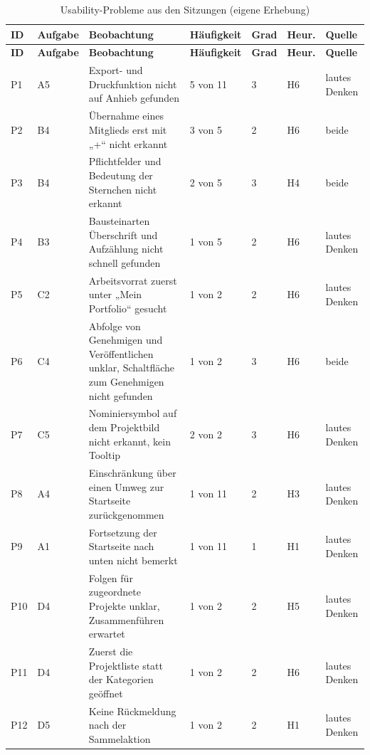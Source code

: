 \begingroup
\small
\setlength{\tabcolsep}{4pt}
\begin{longtable}{@{}L{0.9cm}L{1.2cm}L{4.9cm}L{1.9cm}L{1.1cm}L{0.9cm}L{1.6cm}@{}}
	\caption[Usability-Probleme aus den Sitzungen]{Usability-Probleme aus den Sitzungen (eigene Erhebung)}
	\label{tab:probleme-sitzungen}\\
	\toprule
	\textbf{ID} & \textbf{Aufgabe} & \textbf{Beobachtung} & \textbf{Häufigkeit} & \textbf{Grad} & \textbf{Heur.} & \textbf{Quelle} \\
	\midrule
	\endfirsthead
	\toprule
	\textbf{ID} & \textbf{Aufgabe} & \textbf{Beobachtung} & \textbf{Häufigkeit} & \textbf{Grad} & \textbf{Heur.} & \textbf{Quelle} \\
	\midrule
	\endhead
	\bottomrule
	\endfoot
	P1 & A5 & Export- und Druckfunktion nicht auf Anhieb gefunden & 5 von 11 & 3 & H6 & lautes Denken \\
	P2 & B4 & Übernahme eines Mitglieds erst mit „+“ nicht erkannt & 3 von 5 & 2 & H6 & beide \\
	P3 & B4 & Pflichtfelder und Bedeutung der Sternchen nicht erkannt & 2 von 5 & 3 & H4 & beide \\
	P4 & B3 & Bausteinarten Überschrift und Aufzählung nicht schnell gefunden & 1 von 5 & 2 & H6 & lautes Denken \\
	P5 & C2 & Arbeitsvorrat zuerst unter „Mein Portfolio“ gesucht & 1 von 2 & 2 & H6 & lautes Denken \\
	P6 & C4 & Abfolge von Genehmigen und Veröffentlichen unklar, Schaltfläche zum Genehmigen nicht gefunden & 1 von 2 & 3 & H6 & beide \\
	P7 & C5 & Nominiersymbol auf dem Projektbild nicht erkannt, kein Tooltip & 2 von 2 & 3 & H6 & lautes Denken \\
	P8 & A4 & Einschränkung über einen Umweg zur Startseite zurückgenommen & 1 von 11 & 2 & H3 & lautes Denken \\
	P9 & A1 & Fortsetzung der Startseite nach unten nicht bemerkt & 1 von 11 & 1 & H1 & lautes Denken \\
	P10 & D4 & Folgen für zugeordnete Projekte unklar, Zusammenführen erwartet & 1 von 2 & 2 & H5 & lautes Denken \\
	P11 & D4 & Zuerst die Projektliste statt der Kategorien geöffnet & 1 von 2 & 2 & H6 & lautes Denken \\
	P12 & D5 & Keine Rückmeldung nach der Sammelaktion & 1 von 2 & 2 & H1 & lautes Denken \\
\end{longtable}
\endgroup

